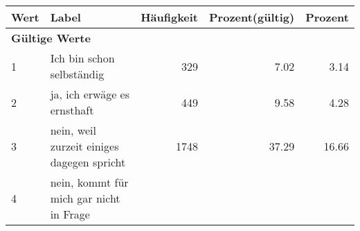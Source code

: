      \begin{longtable}{lXrrr}
     \toprule
     \textbf{Wert} & \textbf{Label} & \textbf{Häufigkeit} & \textbf{Prozent(gültig)} & \textbf{Prozent} \\
     \endhead
     \midrule
     \multicolumn{5}{l}{\textbf{Gültige Werte}}\\

     1 &
     \multicolumn{1}{X}{ Ich bin schon selbständig   } &


       \num{329} &
       \num[round-mode=places,round-precision=2]{7,02} &
         \num[round-mode=places,round-precision=2]{3,14} \\

     2 &
     \multicolumn{1}{X}{ ja, ich erwäge es ernsthaft   } &


       \num{449} &
       \num[round-mode=places,round-precision=2]{9,58} &
         \num[round-mode=places,round-precision=2]{4,28} \\

     3 &
     \multicolumn{1}{X}{ nein, weil zurzeit einiges dagegen spricht   } &


       \num{1748} &
       \num[round-mode=places,round-precision=2]{37,29} &
         \num[round-mode=places,round-precision=2]{16,66} \\

     4 &
     \multicolumn{1}{X}{ nein, kommt für mich gar nicht in Frage   } &



\end{longtable}
